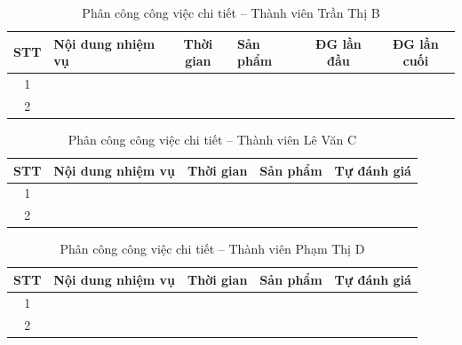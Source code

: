 \begin{landscape}
\begin{table}[htbp]
    \caption{Phân công công việc chi tiết -- Thành viên Trần Thị B}
    \centering
    \begin{tabularx}{\linewidth}{@{} c X c X c c @{}}
    \toprule
    \textbf{STT} & \textbf{Nội dung nhiệm vụ} & \textbf{Thời gian} & \textbf{Sản phẩm} &
    \textbf{ĐG lần đầu} & \textbf{ĐG lần cuối} \\
    \midrule
    1 & & & & & \\[4pt]
    2 & & & & & \\
    \bottomrule
    \end{tabularx}
\end{table}
\end{landscape}

\begin{landscape}
\begin{table}[htbp]
    \caption{Phân công công việc chi tiết -- Thành viên Lê Văn C}
    \centering
    \begin{tabularx}{\linewidth}{@{} c X c X c @{}}
    \toprule
    \textbf{STT} & \textbf{Nội dung nhiệm vụ} & \textbf{Thời gian} & \textbf{Sản phẩm} &
    \textbf{Tự đánh giá} \\
    \midrule
    1 & & & & \\[4pt]
    2 & & & & \\
    \bottomrule
    \end{tabularx}
\end{table}

\vspace{2em}

\begin{table}[htbp]
    \caption{Phân công công việc chi tiết -- Thành viên Phạm Thị D}
    \centering
    \begin{tabularx}{\linewidth}{@{} c X c X c @{}}
    \toprule
    \textbf{STT} & \textbf{Nội dung nhiệm vụ} & \textbf{Thời gian} & \textbf{Sản phẩm} &
    \textbf{Tự đánh giá} \\
    \midrule
    1 & & & & \\[4pt]
    2 & & & & \\
    \bottomrule
    \end{tabularx}
\end{table}
\end{landscape}

\clearpage
\pagestyle{customfancy}   %
